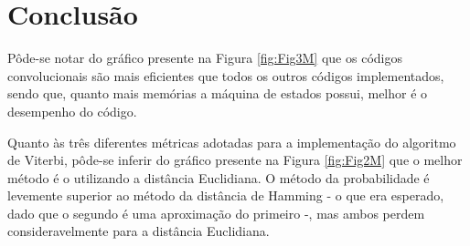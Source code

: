 \section{Conclusão}

 Pôde-se notar do gráfico presente na Figura \ref{fig:Fig3M} que os códigos convolucionais são mais eficientes que todos os outros códigos implementados, sendo que, quanto mais memórias a máquina de estados possui, melhor é o desempenho do código.
 
 Quanto às três diferentes métricas adotadas para a implementação do algoritmo de Viterbi, pôde-se inferir do gráfico presente na Figura \ref{fig:Fig2M} que o melhor método é o utilizando a distância Euclidiana. O método da probabilidade é levemente superior ao método da distância de Hamming - o que era esperado, dado que o segundo é uma aproximação do primeiro -, mas ambos perdem consideravelmente para a distância Euclidiana.
